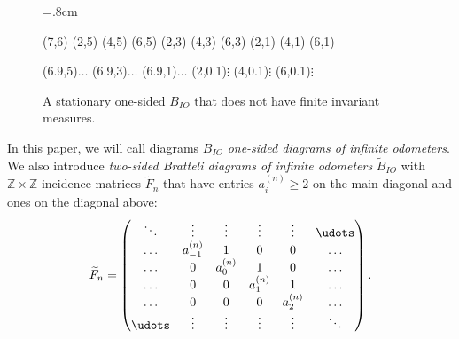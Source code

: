 \documentclass[11pt, twoside]{amsart}
\theoremstyle{definition}
\theoremstyle{remark}
\theoremstyle{plain}
\def\tl{\widetilde}
\newcommand{\Z}{\mathbb Z}
\numberwithin{equation}{section}
\begin{document}
\begin{figure}[hbt!]
\unitlength=.8cm
\begin{graph}(7,6)
 (2,5)
 (4,5)
 (6,5) 
 (2,3)
 (4,3)
 (6,3)
 (2,1)
 (4,1)
 (6,1)

     
 

 
 
 
    \freetext(6.9,5){$\ldots$}
  \freetext(6.9,3){$\ldots$}
    \freetext(6.9,1){$\ldots$}
    \freetext(2,0.1){$\vdots$}
  \freetext(4,0.1){$\vdots$}
    \freetext(6,0.1){$\vdots$}
\end{graph}
\caption{A stationary one-sided $B_{IO}$ that does not have finite invariant measures.}\label{Fig:no measure}
\end{figure}

In this paper, we will call diagrams $B_{IO}$ \textit{one-sided diagrams of infinite odometers}. We also introduce \textit{two-sided Bratteli diagrams of infinite odometers} $\tl B_{IO}$ with $\Z \times \Z$ incidence matrices $\tl F_n$ that have entries $a_i^{(n)} \geq 2$ on the main diagonal and ones on the diagonal above:
    $$
    \tl F_n = 
    \begin{pmatrix}
       \ddots & \vdots & \vdots & \vdots & \vdots & \udots\\
       \ldots & \textbf{$a_{-1}^{(n)}$} & 1 & 0 & 0 &\ldots\\
       \ldots & {0} & \textbf{$a_0^{(n)}$} & 1 & 0 & \ldots\\   
       \ldots & {0} & 0 & \textbf{$a_1^{(n)}$} & 1 & \ldots\\ 
       \ldots & 0 & 0 & 0 & \textbf{$a_{2}^{(n)}$} & \ldots\\     
       \udots & \vdots & \vdots & \vdots & \vdots & \ddots
    \end{pmatrix}.
    $$
\end{document}
